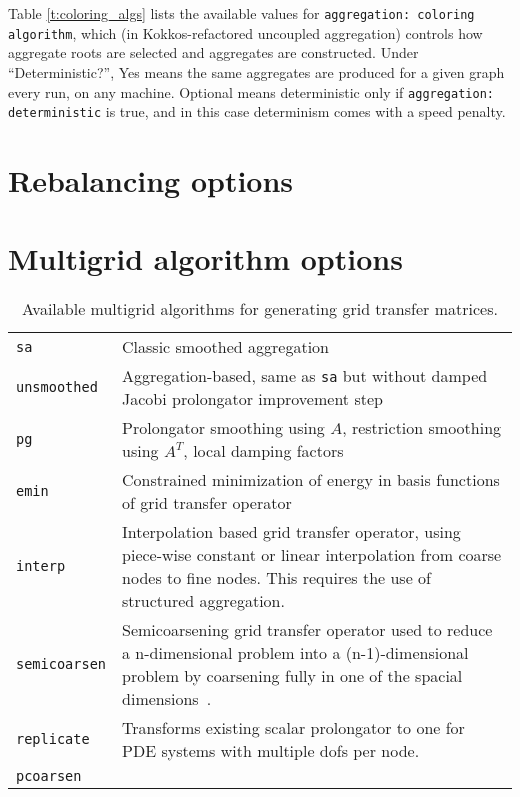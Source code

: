 Table \ref{t:coloring_algs} lists the available values for \verb!aggregation: coloring algorithm!, which (in Kokkos-refactored uncoupled aggregation) controls how aggregate roots are selected and aggregates are constructed. Under ``Deterministic?'', Yes means the same aggregates are produced for a given graph every run, on any machine. Optional means deterministic only if \verb!aggregation: deterministic! is true, and in this case determinism comes with a speed penalty.



\section{Rebalancing options}
\label{sec:options_rebalancing}



\section{Multigrid algorithm options}
\label{sec:options_mg}

\begin{table}[H]
  \begin{center}
    \begin{tabular}{p{3.5cm} p{11cm}}
      \toprule
      \verb!sa!          & Classic smoothed aggregation~\cite{VMB1996} \\
      \verb!unsmoothed!  & Aggregation-based, same as \verb!sa! but without damped Jacobi prolongator improvement step \\
      \verb!pg!          & Prolongator smoothing using $A$, restriction smoothing using $A^T$, local damping factors~\cite{ST2008} \\
      \verb!emin!        & Constrained minimization of energy in basis functions of grid transfer operator~\cite{WTWG2014,OST2011} \\
      \verb!interp!      & Interpolation based grid transfer operator, using piece-wise constant or linear interpolation from coarse nodes to fine nodes. This requires the use of structured aggregation.\\
      \verb!semicoarsen! & Semicoarsening grid transfer operator used to reduce a n-dimensional problem into a (n-1)-dimensional problem by coarsening fully in one of the spacial dimensions~\cite{TPSTP2015}.\\
      \verb!replicate!      & Transforms existing scalar prolongator to one  for PDE systems with multiple dofs per node.\\
      \verb!pcoarsen!    & \\
      \bottomrule
    \end{tabular}
    \caption{Available multigrid algorithms for generating grid transfer matrices. }
\label{t:mgs}
  \end{center}
\end{table}

